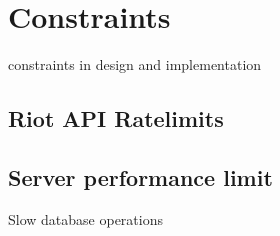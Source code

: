 \section{Constraints}
constraints in design and implementation

\subsection{Riot API Ratelimits}

\subsection{Server performance limit}
Slow database operations